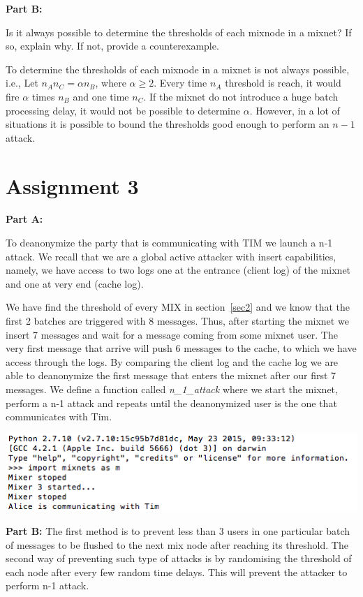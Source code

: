 \documentclass[preprint,12pt,3p]{elsarticle}
\begin{document}
\textbf{Part B:}

Is it always possible to determine the thresholds of each mixnode in a mixnet? If so, explain why. If not, provide a counterexample.

To determine the thresholds of each mixnode in a mixnet is not always possible, i.e., Let $n_A n_C = \alpha n_B$, where $\alpha\ge2$. Every time $n_A$ threshold is reach, it would fire $\alpha$ times $n_B$ and one time $n_C$. If the mixnet do not introduce a huge batch processing delay, it would not be possible to determine $\alpha$. However, in a lot of situations it is possible to bound the thresholds good enough to perform an $n-1$ attack.
\section*{Assignment 3}
\textbf{Part A:}

To deanonymize the party that is communicating with TIM we launch a n-1 attack. We recall that we are a global active attacker with insert capabilities, namely, we have access to two logs one at the entrance (client log) of the mixnet and one at very end (cache log).

We have find the threshold of every MIX in section~\ref{sec2} and we know that the first 2 batches are triggered with 8 messages. Thus, after starting the mixnet we insert 7 messages and wait for a message coming from some mixnet user. The very first message that arrive will push 6 messages to the cache, to which we have access through the logs. By comparing the client log and the cache log we are able to deanonymize the first message that enters the mixnet after our first 7 messages. We define a function called \textit{n\_1\_attack} where we start the mixnet, perform a n-1 attack and repeats until the deanonymized user is the one that communicates with Tim. \newline

\includegraphics[width=\textwidth]{alice}

\textbf{Part B:}
The first method is to prevent less than 3 users in one particular batch of messages to be flushed to the next mix node after reaching its threshold.
The second way of preventing such type of attacks is by randomising the threshold of each node after every few random time delays. This will prevent the attacker to perform n-1 attack.
\end{document}
